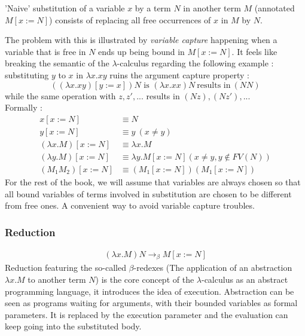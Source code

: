 \documentclass{article}
\begin{document}
    'Naive' substitution of a variable $x$ by a term $N$ in another term $M$ (annotated $M[x:=N]$) consists of replacing all free occurrences of $x$ in $M$ by $N$.\par The problem with this is illustrated by \textit{variable capture} happening when a variable that is free in $N$ ends up being bound in $M[x:=N]$. It feels like breaking the semantic of the $\lambda$-calculus regarding the following example : substituting $y$ to $x$  in $\lambda x.x y$ ruins the argument capture property :
    $$((\lambda x.x y)[y := x])N \text{ is } (\lambda x.x x)N \ \text{results in} \ (N N)$$ while the same operation with $z, z', ...$ results in $(N z), (N z'), ...$\\
    Formally :
    \label{simple substitution}\begin{align}
            x[x:=N] &\equiv N\\
            y[x:=N] &\equiv y \ ( x\neq y)\\
            (\lambda x.M)[x:=N] &\equiv \lambda x.M \\
            (\lambda y.M)[x:=N] &\equiv \lambda y.M[x:=N]  (x\neq y,y\not\in FV(N)) \\
            (M_1 M_2)[x:=N] &\equiv (M_1[x:=N])(M_1[x:=N])
        \end{align}
        For the rest of the book, we will assume that variables are always chosen so that all bound variables of terms involved in substitution are chosen to be different from free ones. A convenient way to avoid variable capture troubles.
    \subsubsection{Reduction}
    \begin{align}
        (\lambda x.M) N \rightarrow_{\beta} M[x:=N]
    \end{align}
    Reduction featuring the so-called $\beta$-redexes (The application of an abstraction $\lambda x.M$ to another term $N$) is the core concept of the $\lambda$-calculus as an abstract programming language, it introduces the idea of execution. Abstraction can be seen as programs waiting for arguments, with their bounded variables as formal parameters. It is replaced by the execution parameter and the evaluation can keep going into the substituted body.
\end{document}
